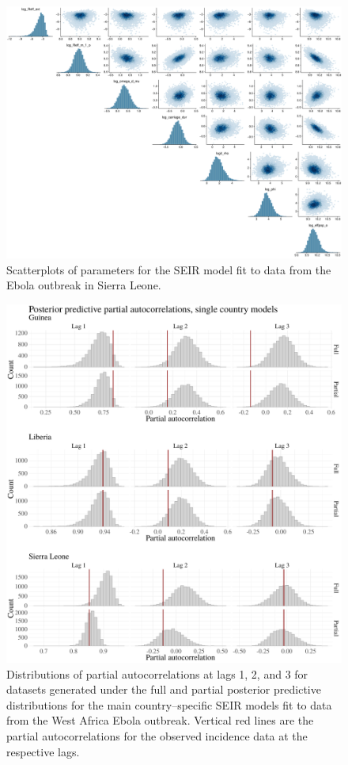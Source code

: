 \begin{figure}[htbp]
	\centering
	\includegraphics[width=\linewidth]{figures/sln_tight_pairs}
	\caption{Scatterplots of parameters for the SEIR model fit to data from the Ebola outbreak in Sierra Leone.}
	\label{fig:sierraleonepairs}
\end{figure}

\begin{figure}[htbp]
	\begin{fullpage}
		\centering
		\includegraphics[width=0.8\linewidth]{figures/ebola_single_pacfs}
		\caption[Posterior predictive distributions of partial autocorrelations for the main country--specific SEIR models fit to data from the West Africa Ebola outbreak.]{Distributions of partial autocorrelations at lags 1, 2, and 3 for datasets generated under the full and partial posterior predictive distributions for the main country--specific SEIR models fit to data from the West Africa Ebola outbreak. Vertical red lines are the partial autocorrelations for the observed incidence data at the respective lags.}
		\label{fig:ebola_single_pacfs}
	\end{fullpage}
\end{figure}

